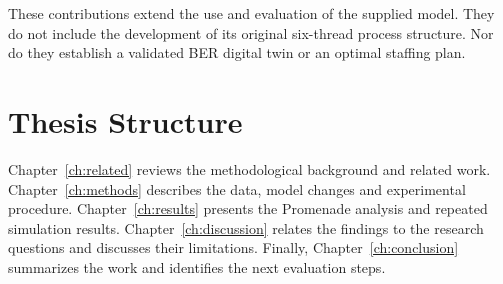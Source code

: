 These contributions extend the use and evaluation of the supplied model. They do not include the development of its original six-thread process structure. Nor do they establish a validated BER digital twin or an optimal staffing plan.

\section{Thesis Structure}
Chapter~\ref{ch:related} reviews the methodological background and related work. Chapter~\ref{ch:methods} describes the data, model changes and experimental procedure. Chapter~\ref{ch:results} presents the Promenade analysis and repeated simulation results. Chapter~\ref{ch:discussion} relates the findings to the research questions and discusses their limitations. Finally, Chapter~\ref{ch:conclusion} summarizes the work and identifies the next evaluation steps.
